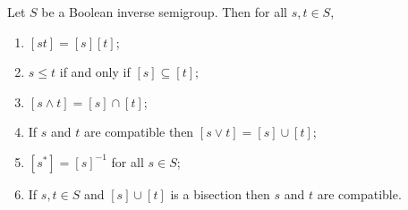 \begin{lemma}[{\cite[Lemma 2.21(2)-(8)]{MR2827424}}]\label{lemmabisectionsgs}
Let $S$ be a Boolean inverse semigroup. Then for all $s,t\in S$,
\begin{enumerate}
\item[(a)] $[st]=[s][t]$;
\item[(b)] $s\leq t$ if and only if $[s]\subseteq[t]$;
\item[(c)] $[s\land t]=[s]\cap[t]$;
\item[(d)] If $s$ and $t$ are compatible then $[s\lor t]=[s]\cup[t]$;
\item[(e)] $[s^*]=[s]^{-1}$ for all $s\in S$;
\item[(f)] If $s,t\in S$ and $[s]\cup[t]$ is a bisection then $s$ and $t$ are compatible.
\end{enumerate}
\end{lemma}
